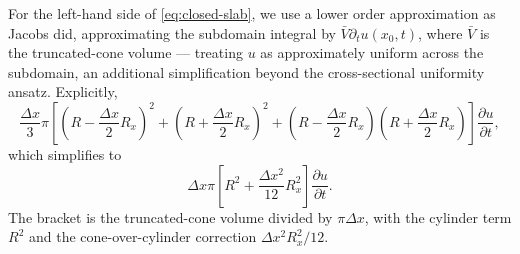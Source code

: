 \documentclass[11pt]{article}
\begin{document}
For the left-hand side of \eqref{eq:closed-slab}, we use a lower order approximation as Jacobs did, approximating the subdomain integral by $\bar V \partial_t u(x_0, t)$, where $\bar V$ is the truncated-cone volume --- treating $u$ as approximately uniform across the subdomain, an additional simplification beyond the cross-sectional uniformity ansatz. Explicitly,
\begin{displaymath}
\frac{\Delta x}{3}\pi \left[ \left( R - \frac{\Delta x}{2} R_x\right)^2 + \left( R + \frac{\Delta x}{2} R_x\right)^2 + \left( R - \frac{\Delta x}{2} R_x\right) \left( R + \frac{\Delta x}{2} R_x\right) \right] \frac{\partial u}{\partial t},
\end{displaymath}
which simplifies to
\begin{equation}
    \Delta x \pi \left[ R^2 + \frac{\Delta x^2}{12} R_x^2 \right] \frac{\partial u}{\partial t}.
    \label{eq:lhs-coneVol}
\end{equation}
The bracket is the truncated-cone volume divided by $\pi \Delta x$, with the cylinder term $R^2$ and the cone-over-cylinder correction $\Delta x^2 R_x^2/12$.
\end{document}
